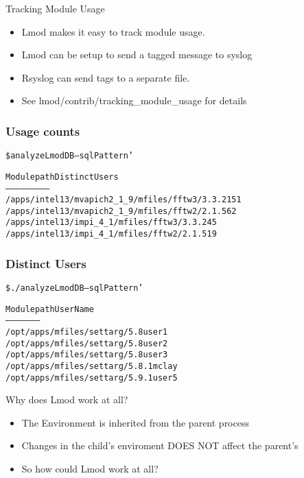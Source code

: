 \documentclass[dvipsnames,aspectratio=169]{beamer}
\begin{document}
\begin{frame}{Tracking Module Usage}
  \begin{itemize}
    \item Lmod makes it easy to track module usage.
    \item Lmod can be setup to send a tagged message to syslog
    \item Rsyslog can send tags to a separate file.
    \item See lmod/contrib/tracking\_module\_usage for details
  \end{itemize}
\end{frame}

\begin{frame}[fragile]
    \frametitle{Usage counts}
  {\small
    \begin{alltt}
    \$ analyzeLmodDB --sqlPattern '%fftw%' --start '2015-01-01 --end '2015-02-01'  counts

        Module path                                   Distinct Users
        -----------                                   --------------  
        /apps/intel13/mvapich2\_1\_9/mfiles/fftw3/3.3.2             151
        /apps/intel13/mvapich2\_1\_9/mfiles/fftw2/2.1.5              62
        /apps/intel13/impi\_4\_1/mfiles/fftw3/3.3.2                  45
        /apps/intel13/impi\_4\_1/mfiles/fftw2/2.1.5                  19

    \end{alltt}
}
\end{frame}

\begin{frame}[fragile]
    \frametitle{Distinct Users}
  {\small
    \begin{alltt}
     \$ ./analyzeLmodDB --sqlPattern '%/apps/modulefiles/settarg%' usernames

     Module path                       User Name
     -----------                       ---------
     /opt/apps/mfiles/settarg/5.8      user1
     /opt/apps/mfiles/settarg/5.8      user2
     /opt/apps/mfiles/settarg/5.8      user3
     /opt/apps/mfiles/settarg/5.8.1    mclay
     /opt/apps/mfiles/settarg/5.9.1    user5
    \end{alltt}
}
\end{frame}

\begin{frame}{Why does Lmod work at all?}
  \begin{itemize}
    \item The Environment is inherited from the parent process
    \item Changes in the child's enviroment DOES NOT affect the
      parent's
    \item So how could Lmod work at all? 
  \end{itemize}
\end{frame}
\end{document}
